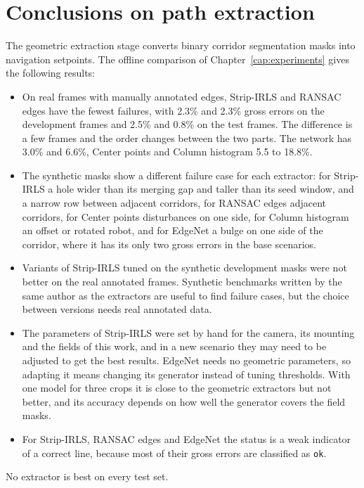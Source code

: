 \section{Conclusions on path extraction}
\label{sec:geometric_conclusions}

The geometric extraction stage converts binary corridor segmentation masks into navigation setpoints. The offline comparison of Chapter~\ref{cap:experiments} gives the following results:
\begin{itemize}
    \item On real frames with manually annotated edges, Strip-IRLS and RANSAC edges have the fewest failures, with 2.3\% and 2.3\% gross errors on the development frames and 2.5\% and 0.8\% on the test frames. The difference is a few frames and the order changes between the two parts. The network has 3.0\% and 6.6\%, Center points and Column histogram 5.5 to 18.8\%.
    \item The synthetic masks show a different failure case for each extractor: for Strip-IRLS a hole wider than its merging gap and taller than its seed window, and a narrow row between adjacent corridors, for RANSAC edges adjacent corridors, for Center points disturbances on one side, for Column histogram an offset or rotated robot, and for EdgeNet a bulge on one side of the corridor, where it has its only two gross errors in the base scenarios.
    \item Variants of Strip-IRLS tuned on the synthetic development masks were not better on the real annotated frames. Synthetic benchmarks written by the same author as the extractors are useful to find failure cases, but the choice between versions needs real annotated data.
    \item The parameters of Strip-IRLS were set by hand for the camera, its mounting and the fields of this work, and in a new scenario they may need to be adjusted to get the best results. EdgeNet needs no geometric parameters, so adapting it means changing its generator instead of tuning thresholds. With one model for three crops it is close to the geometric extractors but not better, and its accuracy depends on how well the generator covers the field masks.
    \item For Strip-IRLS, RANSAC edges and EdgeNet the status is a weak indicator of a correct line, because most of their gross errors are classified as \texttt{ok}.
\end{itemize}

No extractor is best on every test set.

